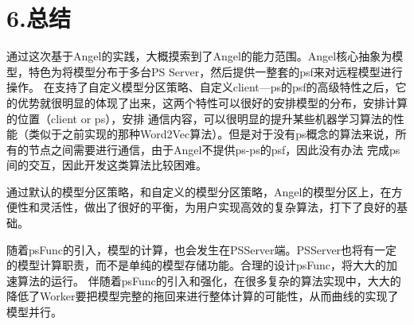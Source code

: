 \documentclass{article}
\begin{document}
\section{6.\hspace*{0.5em}总结}\label{section}%

\noindent{}\hspace*{1em}\hspace*{1em}通过这次基于Angel的实践，大概摸索到了Angel的能力范围。Angel核心抽象为模型，特色为将模型分布于多台PS Server，然后提供一整套的psf来对远程模型进行操作。
在支持了自定义模型分区策略、自定义client—ps的psf的高级特性之后，它的优势就很明显的体现了出来，这两个特性可以很好的安排模型的分布，安排计算的位置（client or ps），安排
通信内容，可以很明显的提升某些机器学习算法的性能（类似于之前实现的那种Word2Vec算法）。但是对于没有ps概念的算法来说，所有的节点之间需要进行通信，由于Angel不提供ps-ps的psf，因此没有办法
完成ps间的交互，因此开发这类算法比较困难。%

\hspace*{1em}\hspace*{1em}通过默认的模型分区策略，和自定义的模型分区策略，Angel的模型分区上，在方便性和灵活性，做出了很好的平衡，为用户实现高效的复杂算法，打下了良好的基础。%

\hspace*{1em}\hspace*{1em}随着psFunc的引入，模型的计算，也会发生在PSServer端。PSServer也将有一定的模型计算职责，而不是单纯的模型存储功能。合理的设计psFunc，将大大的加速算法的运行。
伴随着psFunc的引入和强化，在很多复杂的算法实现中，大大的降低了Worker要把模型完整的拖回来进行整体计算的可能性，从而曲线的实现了模型并行。%
\end{document}
